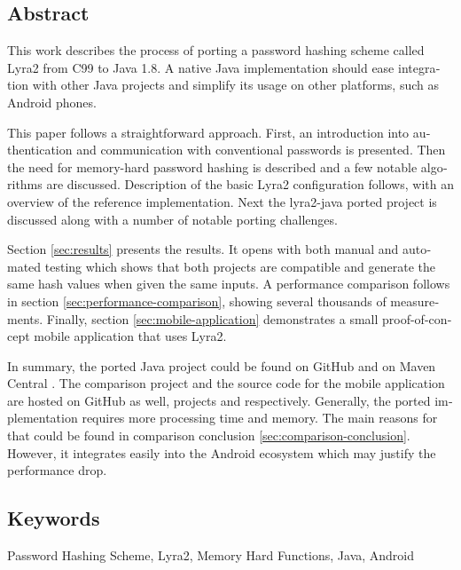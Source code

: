 \cleardoublepage
{}

\begin{otherlanguage}{english}
\chapter*{Abstract}

This work describes the process of porting a password hashing scheme called Lyra2 from C99 to Java 1.8. A native Java implementation should ease integration with other Java projects and simplify its usage on other platforms, such as Android phones.

This paper follows a straightforward approach. First, an introduction into authentication and communication with conventional passwords is presented. Then the need for memory-hard password hashing is described and a few notable algorithms are discussed. Description of the basic Lyra2 configuration follows, with an overview of the reference implementation. Next the lyra2-java ported project is discussed along with a number of notable porting challenges.

Section \ref{sec:results} presents the results. It opens with both manual and automated testing which shows that both projects are compatible and generate the same hash values when given the same inputs. A performance comparison follows in section \ref{sec:performance-comparison}, showing several thousands of measurements. Finally, section \ref{sec:mobile-application} demonstrates a small proof-of-concept mobile application that uses Lyra2.

In summary, the ported Java project could be found on GitHub \cite{github:2017:lyra2-java} and on Maven Central \cite{maven:2017:lyra2}. The comparison project and the source code for the mobile application are hosted on GitHub as well, projects \cite{github:2017:lyra2-compare} and \cite{github:2017:lyra2-mobile} respectively. Generally, the ported implementation requires more processing time and memory. The main reasons for that could be found in comparison conclusion \ref{sec:comparison-conclusion}. However, it integrates easily into the Android ecosystem which may justify the performance drop.

\bigskip

\section*{Keywords}
Password Hashing Scheme, Lyra2, Memory Hard Functions, Java, Android

\end{otherlanguage}
